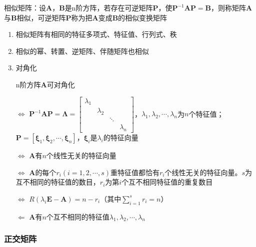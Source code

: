 \documentclass[12pt]{book}
\begin{document}
相似矩阵：设$\bm{A}$，$\bm{B}$是n阶方阵，若存在可逆矩阵$\bm{P}$，使$\bm{P}^{-1}\bm{AP}=\bm{B}$，则称矩阵$\bm{A}$与$\bm{B}$相似，可逆矩阵$\bm{P}$称为把$\bm{A}$变成$\bm{B}$的相似变换矩阵

\begin{enumerate}[1.]
    \item 相似矩阵有相同的特征多项式、特征值、行列式、秩
    \item 相似的幂、转置、逆矩阵、伴随矩阵也相似
    \item 对角化
        \par n阶方阵$\bm{A}$可对角化
        \par $\Leftrightarrow$ $\bm{P}^{-1}\bm{AP}=\bm{\Lambda}=\begin{bmatrix}
           \lambda_1 &  & & \\
           & \lambda_2 & & \\
           & & \ddots & \\
           & & & \lambda_n 
        \end{bmatrix}$，$\lambda_1,\lambda_2,\cdots,\lambda_n$为$n$个特征值；$\bm{P}=[\bm{\xi}_1,\bm{\xi}_2,\cdots,\bm{\xi}_n]$，$\bm{\xi}_i$是$\lambda_i$的特征向量
        \par $\Leftrightarrow$ $\bm{A}$有$n$个线性无关的特征向量
        \par $\Leftrightarrow$ $\bm{A}$的每个$r_i(i=1,2,\cdots,s)$重特征值都恰有$r_i$个线性无关的特征向量。$s$为互不相同的特征值的数目，$r_i$为第$i$个互不相同特征值的重复数目
        \par $\Leftrightarrow$ $R(\lambda_i\bm{E}-\bm{A})=n-r_{i}$（其中$\sum_{i=1}^{s}{r_i}=n$）
        \par $\Leftarrow$ $\bm{A}$有$n$个互不相同的特征值$\lambda_1,\lambda_2,\cdots,\lambda_n$
\end{enumerate}









\subsubsection{正交矩阵}
\end{document}
